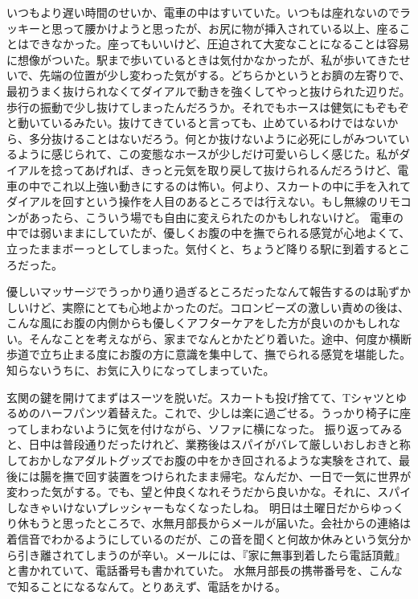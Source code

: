 いつもより遅い時間のせいか、電車の中はすいていた。いつもは座れないのでラッキーと思って腰かけようと思ったが、お尻に物が挿入されている以上、座ることはできなかった。座ってもいいけど、圧迫されて大変なことになることは容易に想像がついた。駅まで歩いているときは気付かなかったが、私が歩いてきたせいで、先端の位置が少し変わった気がする。どちらかというとお臍の左寄りで、最初うまく抜けられなくてダイアルで動きを強くしてやっと抜けられた辺りだ。歩行の振動で少し抜けてしまったんだろうか。それでもホースは健気にもぞもぞと動いているみたい。抜けてきていると言っても、止めているわけではないから、多分抜けることはないだろう。何とか抜けないように必死にしがみついているように感じられて、この変態なホースが少しだけ可愛いらしく感じた。私がダイアルを捻ってあげれば、きっと元気を取り戻して抜けられるんだろうけど、電車の中でこれ以上強い動きにするのは怖い。何より、スカートの中に手を入れてダイアルを回すという操作を人目のあるところでは行えない。もし無線のリモコンがあったら、こういう場でも自由に変えられたのかもしれないけど。
電車の中では弱いままにしていたが、優しくお腹の中を撫でられる感覚が心地よくて、立ったままボーっとしてしまった。気付くと、ちょうど降りる駅に到着するところだった。

優しいマッサージでうっかり通り過ぎるところだったなんて報告するのは恥ずかしいけど、実際にとても心地よかったのだ。コロンビーズの激しい責めの後は、こんな風にお腹の内側からも優しくアフターケアをした方が良いのかもしれない。そんなことを考えながら、家までなんとかたどり着いた。途中、何度か横断歩道で立ち止まる度にお腹の方に意識を集中して、撫でられる感覚を堪能した。知らないうちに、お気に入りになってしまっていた。

玄関の鍵を開けてまずはスーツを脱いだ。スカートも投げ捨てて、Tシャツとゆるめのハーフパンツ着替えた。これで、少しは楽に過ごせる。うっかり椅子に座ってしまわないように気を付けながら、ソファに横になった。
振り返ってみると、日中は普段通りだったけれど、業務後はスパイがバレて厳しいおしおきと称しておかしなアダルトグッズでお腹の中をかき回されるような実験をされて、最後には腸を撫で回す装置をつけられたまま帰宅。なんだか、一日で一気に世界が変わった気がする。でも、望と仲良くなれそうだから良いかな。それに、スパイしなきゃいけないプレッシャーもなくなったしね。
明日は土曜日だからゆっくり休もうと思ったところで、水無月部長からメールが届いた。会社からの連絡は着信音でわかるようにしているのだが、この音を聞くと何故か休みという気分から引き離されてしまうのが辛い。メールには、『家に無事到着したら電話頂戴』と書かれていて、電話番号も書かれていた。
水無月部長の携帯番号を、こんなで知ることになるなんて。とりあえず、電話をかける。

